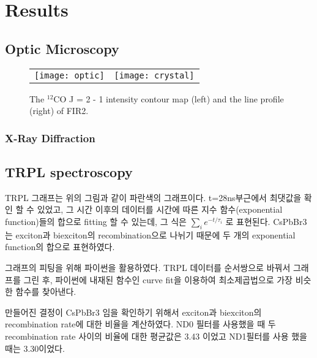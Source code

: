 \section{Results}


\subsection{Optic Microscopy}

\begin{figure}[h!]
	\begin{center}
		\begin{tabular}{cc}
			\texttt{[image: optic]} &   \texttt{[image: crystal]}
		\end{tabular}
		\caption{The $^{12}$CO J = 2 - 1 intensity contour map (left) and the line profile (right) of FIR2.}	
		\label{fig:FIR221}
	\end{center}
\end{figure}


\newpage
\subsubsection{X-Ray Diffraction}

\clearpage
\newpage
\subsection{TRPL spectroscopy}

TRPL 그래프는 위의 그림과 같이 파란색의 그래프이다. t=28ns부근에서 최댓값을 확인 할 수 있었고, 그 시간 이후의 데이터를 시간에 따른 지수 함수(exponential function)들의 합으로 fitting 할 수 있는데, 그 식은 $\sum_{i}^{} {e}^{-t/{\tau}_{i}}$ 로 표현된다. CsPbBr3는 exciton과 biexciton의 recombination으로 나뉘기 때문에 두 개의 exponential function의 합으로 표현하였다. 

그래프의 피팅을 위해 파이썬을 활용하였다. TRPL 데이터를 순서쌍으로 바꿔서 그래프를 그린 후, 파이썬에 내재된 함수인 curve fit을 이용하여 최소제곱법으로 가장 비슷한 함수를 찾아낸다. 

만들어진 결정이 CsPbBr3 임을 확인하기 위해서 exciton과 biexciton의 recombination rate에 대한 비율을 계산하였다. 
ND0 필터를 사용했을 때 두 recombination rate 사이의 비율에 대한 평균값은 3.43 이었고 ND1필터를 사용 했을 때는 3.30이었다.